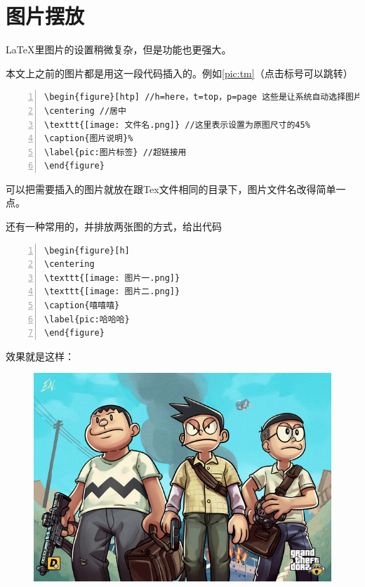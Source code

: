 \documentclass[12pt,a4paper,oneside]{book}
\begin{document}
{\section{图片摆放}
\LaTeX 里图片的设置稍微复杂，但是功能也更强大。
\par
本文上之前的图片都是用这一段代码插入的。例如\ref{pic:tm}（点击标号可以跳转）
\par
\begin{lstlisting}[language={[ANSI]C}, numbers=left, numberstyle=\tiny, keywordstyle=\color{blue!70},  frame=shadowbox, rulesepcolor=\color{red!20!green!20!blue!20}]
\begin{figure}[htp] //h=here，t=top，p=page 这些是让系统自动选择图片最合适的位置
\centering //居中
\texttt{[image: 文件名.png]} //这里表示设置为原图尺寸的45%
\caption{图片说明}% 
\label{pic:图片标签} //超链接用
\end{figure}
\end{lstlisting}
\par
可以把需要插入的图片就放在跟Tex文件相同的目录下，图片文件名改得简单一点。
\par
还有一种常用的，并排放两张图的方式，给出代码~
\par
\begin{lstlisting}[language={[ANSI]C}, numbers=left, numberstyle=\tiny, keywordstyle=\color{blue!70},  frame=shadowbox, rulesepcolor=\color{red!20!green!20!blue!20}]
\begin{figure}[h]
\centering
\texttt{[image: 图片一.png]}
\texttt{[image: 图片二.png]}
\caption{嘻嘻嘻}
\label{pic:哈哈哈}
\end{figure}
\end{lstlisting}
\par
效果就是这样：
\par
\begin{figure}[h]
\centering
\includegraphics[scale=0.21]{tr.png}

\end{figure}}
\end{document}

